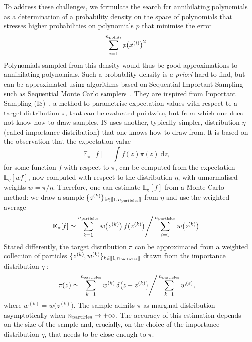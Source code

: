 \documentclass[11pt,a4paper]{article}
\renewcommand{\d}{\ensuremath{\mathrm{d}}\xspace}
\begin{document}
	To address these challenges, we formulate the search for annihilating polynomials as a determination of a probability density on the space of polynomials that stresses higher probabilities on polynomials $p$ that minimise the error
	\begin{equation}
		\sum_{i=1}^{n_{\rm points}}p\big(\vec{x}^{(i)}\big)^{2}.
	\end{equation}
	Polynomials sampled from this density would thus be good approximations to annihilating polynomials. Such a probability density is \textit{a priori} hard to find, but can be approximated using algorithms based on Sequential Important Sampling~\cite{Doucet2001,Liu2004} such as Sequential Monte Carlo samplers~\cite{del2006sequential}. They are inspired from Important Sampling (IS)~\cite{osti_4441935,RobertCasella2004}, a method to parametrise expectation values with respect to a target distribution $\pi$, that can be evaluated pointwise, but from which one does not know how to draw samples. IS uses another, typically simpler, distribution $\eta$ (called importance distribution) that one knows how to draw from. It is based on the observation that the expectation value
	\begin{equation}
		\mathbb{E}_{\pi}[f] = \int f(z)\pi(z)\ \d z,
	\end{equation}
	for some function $f$ with respect to $\pi$, can be computed from the expectation $\mathbb{E}_{\eta}[w f]$, now computed with respect to the distribution $\eta$, with unnormalised weights $w = \pi/\eta$. Therefore, one can estimate $\mathbb{E}_{\pi}[f]$ from a Monte Carlo method: we draw a sample $\{z^{(k)}\}_{k\in\llbracket 1, n_{\rm particles}\rrbracket}$ from $\eta$ and use the weighted average
	\begin{equation}
		\mathbb{E}_{\pi}[f] \simeq \displaystyle \sum_{k=1}^{n_{\rm particles}} w\big(z^{(k)}\big)\,f\big(z^{(k)}\big)\Bigg/\displaystyle \sum_{i=1}^{n_{\rm particles}} w\big(z^{(k)}\big).
	\end{equation}
	Stated differently, the target distribution $\pi$ can be approximated from a weighted collection of particles $\{z^{(k)},w^{(k)}\}_{k\in\llbracket 1, n_{\rm particles}\rrbracket}$ drawn from the importance distribution $\eta$ :
	\begin{equation}
		\pi(z) \simeq \displaystyle \sum_{k=1}^{n_{\rm particles}} w^{(k)}\,\delta\big(z-z^{(k)}\big)\Bigg/\displaystyle \sum_{k=1}^{n_{\rm particles}} w^{(k)},
	\end{equation}
	where $w^{(k)} = w\big(z^{(k)}\big)$. The sample admits $\pi$ as marginal distribution asymptotically when $n_{\rm particles}\rightarrow+\infty$. The accuracy of this estimation depends on the size of the sample and, crucially, on the choice of the importance distribution $\eta$, that needs to be close enough to $\pi$. 
	
\end{document}
